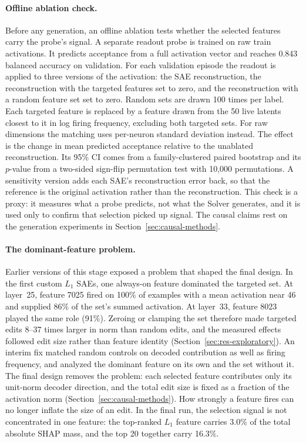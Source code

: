 \paragraph{Offline ablation check.} Before any generation, an offline
ablation tests whether the selected features carry the probe's signal. A
separate readout probe is trained on raw train activations. It predicts
acceptance from a full activation vector and reaches 0.843 balanced accuracy on
validation. For each validation episode the readout is applied to three
versions of the activation: the SAE reconstruction, the reconstruction with
the targeted features set to zero, and the reconstruction with a random
feature set set to zero. Random sets are drawn 100 times per label. Each
targeted feature is replaced by a feature drawn from the 50 live latents
closest to it in log firing frequency, excluding both targeted sets. For raw
dimensions the matching uses per-neuron standard deviation instead. The effect
is the change in mean predicted acceptance relative to the unablated
reconstruction. Its 95\% CI comes from a family-clustered paired bootstrap and
its $p$-value from a two-sided sign-flip permutation test with 10,000
permutations. A sensitivity version adds each SAE's reconstruction error
back, so that the reference is the original activation rather than the
reconstruction. This check is a proxy: it measures what a probe predicts, not
what the Solver generates, and it is used only to confirm that selection
picked up signal. The causal claims rest on the generation experiments in
Section~\ref{sec:causal-methods}.

\paragraph{The dominant-feature problem.} Earlier versions of this stage
exposed a problem that shaped the final design. In the first custom $L_1$ SAEs,
one always-on feature dominated the targeted set. At layer~25, feature 7025
fired on 100\% of examples with a mean activation near 46 and supplied 86\% of
the set's summed activation. At layer~33, feature 8023 played the same role
(91\%). Zeroing or clamping the set therefore made targeted edits 8--37 times
larger in norm than random edits, and the measured effects followed edit size
rather than feature identity (Section~\ref{sec:res-exploratory}). An
interim fix matched random controls on decoded contribution as well as firing
frequency, and analyzed the dominant feature on its own and the set without
it. The final design removes the problem: each selected feature contributes
only its unit-norm decoder direction, and the total edit size is fixed as a
fraction of the activation norm (Section~\ref{sec:causal-methods}). How
strongly a feature fires can no longer inflate the size of an edit. In the final
run, the selection signal is not concentrated in one feature: the top-ranked
$L_1$ feature carries 3.0\% of the total absolute SHAP mass, and the top 20
together carry 16.3\%.

